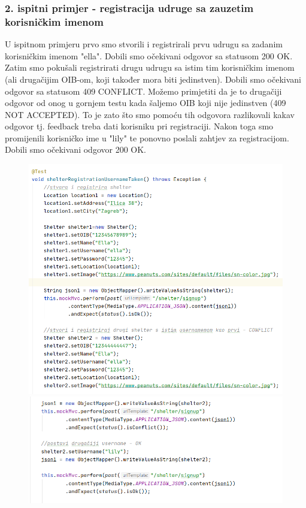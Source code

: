 			
			
			\subsubsection{2. ispitni primjer - registracija udruge sa zauzetim korisničkim imenom}
			
			U ispitnom primjeru prvo smo stvorili i registrirali prvu udrugu sa zadanim korisničkim imenom "ella". Dobili smo očekivani odgovor sa statusom 200 OK. Zatim smo pokušali registrirati drugu udrugu sa istim tim korisničkim imenom (ali drugačijim OIB-om, koji također mora biti jedinstven). Dobili smo očekivani odgovor sa statusom 409 CONFLICT. Možemo primjetiti da je to drugačiji odgovor od onog u gornjem testu kada šaljemo OIB koji nije jedinstven (409 NOT ACCEPTED). To je zato što smo pomoću tih odgovora razlikovali kakav odgovor tj. feedback treba dati korisniku pri registraciji. Nakon toga smo promijenili korisničko ime u "lily" te ponovno poslali zahtjev za registracijom. Dobili smo očekivani odgovor 200 OK.
			
			\begin{figure}[H]
				\centerline{
					\includegraphics[scale=0.75]{slike/shelter2.1.PNG}}
				\hspace*{-0.22in}
				\includegraphics[scale=0.75]{slike/shelter2.2.PNG} %
				\centering
			\end{figure}
			
